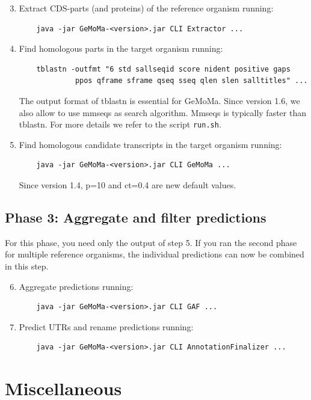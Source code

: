 \documentclass{article}
\begin{document}
\begin{enumerate}
\setcounter{enumi}{2}
\item Extract CDS-parts (and proteins) of the reference organism running:
	\begin{verbatim}
	java -jar GeMoMa-<version>.jar CLI Extractor ...
	\end{verbatim}
\item Find homologous parts in the target organism running: 
	\begin{verbatim}
	tblastn -outfmt "6 std sallseqid score nident positive gaps
	         ppos qframe sframe qseq sseq qlen slen salltitles" ...
	\end{verbatim}
	The output format of tblastn is essential for GeMoMa. Since version 1.6, we also allow to use mmseqs as search algorithm. Mmseqs is typically faster than tblastn. For more details we refer to the script \verb+run.sh+.
\item Find homologous candidate transcripts in the target organism running:
	\begin{verbatim}
	java -jar GeMoMa-<version>.jar CLI GeMoMa ...
	\end{verbatim}
	Since version 1.4, p=10 and ct=0.4 are new default values.
\end{enumerate}

\subsection{Phase 3: Aggregate and filter predictions}
For this phase, you need only the output of step 5.
If you ran the second phase for multiple reference organisms, the individual predictions can now be combined in this step.

\begin{enumerate}
\setcounter{enumi}{5}
\item Aggregate predictions running: 
	\begin{verbatim}
	java -jar GeMoMa-<version>.jar CLI GAF ...
	\end{verbatim}
\item Predict UTRs and rename predictions running: 
	\begin{verbatim}
	java -jar GeMoMa-<version>.jar CLI AnnotationFinalizer ...
	\end{verbatim}
\end{enumerate}

\clearpage
\section{Miscellaneous}
\end{document}
